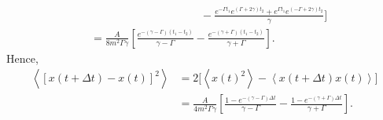 \documentclass[10pt,a4paper]{article}
\begin{document}
\begin{enumerate}
\begin{align}
    &\qquad\qquad\qquad\qquad\qquad - \frac{e^{-\Gamma t_1} e^{(\Gamma+2\gamma)t_2} + e^{\Gamma t_1} e^{(-\Gamma+2\gamma)t_2}}{\gamma}\Bigg] \\
  &= \frac{A}{8m^2\Gamma\gamma} \left[\frac{e^{-(\gamma-\Gamma)(t_1-t_2)}}{\gamma-\Gamma} - \frac{e^{-(\gamma+\Gamma)(t_1-t_2)}}{\gamma+\Gamma} \right].
\end{align}
Hence,
\begin{align}
  \left\langle [x(t+\Delta t) - x(t)]^2\right\rangle &= 2\Big[\left\langle x(t)^2\right\rangle - \left\langle x(t+\Delta t) x(t)\right\rangle\Big] \\
  &= \frac{A}{4m^2\Gamma\gamma} \left[\frac{1-e^{-(\gamma-\Gamma)\Delta t}}{\gamma-\Gamma} - \frac{1-e^{-(\gamma+\Gamma)\Delta t}}{\gamma+\Gamma} \right].
\end{align}
\end{enumerate}
\end{document}
